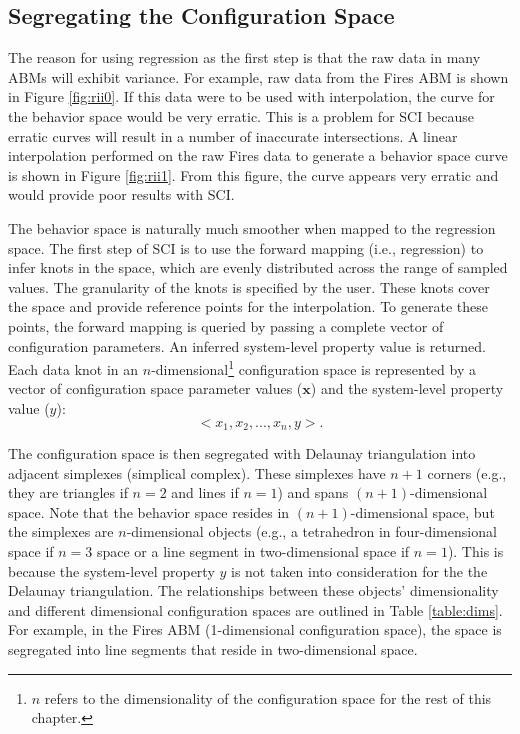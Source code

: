 \subsection{Segregating the Configuration Space}
The reason for using regression as the first step is that the raw data in many ABMs will exhibit variance.
For example, raw data from the Fires ABM is shown in Figure \ref{fig:rii0}.
If this data were to be used with interpolation, the curve for the behavior space would be very erratic.
This is a problem for SCI because erratic curves will result in a number of inaccurate intersections.
A linear interpolation performed on the raw Fires data to generate a behavior space curve is shown in Figure \ref{fig:rii1}.
From this figure, the curve appears very erratic and would provide poor results with SCI.


The behavior space is naturally much smoother when mapped to the regression space.
The first step of SCI is to use the forward mapping (i.e., regression) to infer knots in the space, which are evenly distributed across the range of sampled values.
The granularity of the knots is specified by the user.
These knots cover the space and provide reference points for the interpolation.
To generate these points, the forward mapping is queried by passing a complete vector of configuration parameters.
An inferred system-level property value is returned.
Each data knot in an $n$-dimensional\footnote{$n$ refers to the dimensionality of the configuration space for the rest of this chapter.}  configuration space is represented by a vector of configuration space parameter values ($\mathbf x$) and the system-level property value ($y$):
\[<x_1, x_2, ..., x_n, y>.\]

The configuration space is then segregated with Delaunay triangulation\cite{delaunay1934sphere} into adjacent simplexes (simplical complex).
These simplexes have $n + 1$ corners (e.g., they are triangles if $n=2$ and lines if $n=1$) and spans $(n+1)$-dimensional space.
Note that the behavior space resides in $(n+1)$-dimensional space, but the simplexes are $n$-dimensional objects (e.g., a tetrahedron in four-dimensional space if $n=3$ space or a line segment in two-dimensional space if $n=1$).
This is because the system-level property $y$ is not taken into consideration for the the Delaunay triangulation.
The relationships between these objects' dimensionality and different dimensional configuration spaces are outlined in Table \ref{table:dims}.
For example, in the Fires ABM (1-dimensional configuration space), the space is segregated into line segments that reside in two-dimensional space.

